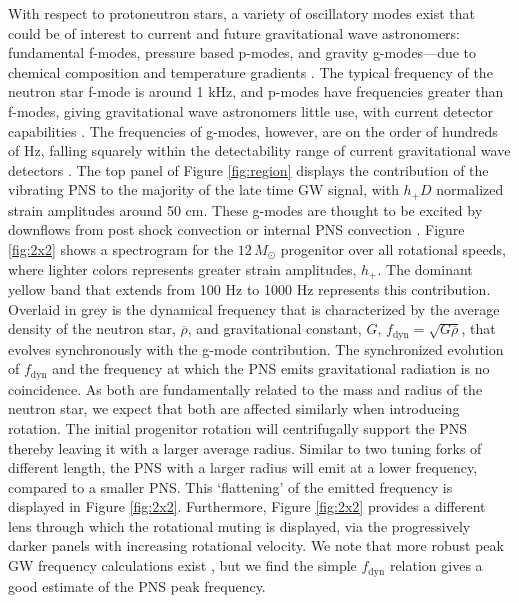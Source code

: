 \documentclass[twocolumn,times]{aastex62}  %
\begin{document}
 
With respect to protoneutron stars, a variety of oscillatory modes exist that could be of interest to current and future gravitational wave astronomers: fundamental f-modes, pressure based p-modes, and gravity g-modes---due to chemical composition and temperature gradients \citep{unno:1989}.  The typical frequency of the neutron star f-mode is around 1 kHz, and p-modes have frequencies greater than f-modes, giving gravitational wave astronomers little use, with current detector capabilities \citep{ho:2018}.  
The frequencies of g-modes, however, are on the order of hundreds of Hz, falling squarely within the detectability range of current gravitational wave detectors \citep{martynov:2016}.  
The top panel of Figure \ref{fig:region} displays the contribution of the vibrating PNS to the majority of the late time GW signal, with $h_+D$ normalized strain amplitudes around 50 cm.  
These g-modes are thought to be excited by downflows from post shock convection or internal PNS convection \citep{murphy:2009,marek:2009b,muller:2013}.  
Figure \ref{fig:2x2} shows a spectrogram for the $12 \, M_\odot$ progenitor over all rotational speeds, where lighter colors represents greater strain amplitudes, $h_+$.  The dominant yellow band that extends from 100 Hz to 1000 Hz represents this contribution.  
Overlaid in grey is the dynamical frequency that is characterized by the average density of the neutron star, $\overline{\rho}$, and gravitational constant, $G$, $f_\mathrm{dyn} = \sqrt{G \overline{\rho}}$,  that evolves synchronously with the g-mode contribution.  The synchronized evolution of $f_\mathrm{dyn}$ and the frequency at which the PNS emits gravitational radiation is no coincidence.  As both are fundamentally related to the mass and radius of the neutron star, we expect that both are affected similarly when introducing rotation.  The initial progenitor rotation will centrifugally support the PNS thereby leaving it with a larger average radius.  Similar to two tuning forks of different length, the PNS with a larger radius will emit at a lower frequency, compared to a smaller PNS.  This `flattening' of the emitted frequency is displayed in Figure \ref{fig:2x2}.  Furthermore, Figure \ref{fig:2x2} provides a different lens through which the rotational muting is displayed, via the progressively darker panels with increasing rotational velocity.  We note that more robust peak GW frequency calculations exist \citep[e.g.,][]{muller:2013,moro:2018}, but we find the simple $f_\mathrm{dyn}$ relation gives a good estimate of the PNS peak frequency.
\end{document}
